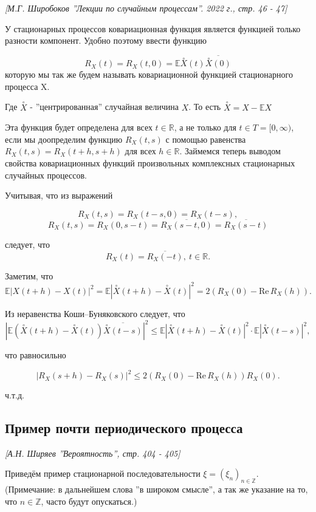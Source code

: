 \emph{[М.Г. Широбоков ''Лекции по случайным процессам''. 2022 г., стр. 46 - 47]}

У стационарных процессов ковариационная функция является
функцией только разности компонент. Удобно поэтому ввести функцию

$$R_X (t) = R_X (t,0) = \mathbb{E}\overset{\circ}{X}(t) \overline{\overset{\circ}{X}(0)}$$ которую мы так же будем называть ковариационной функцией стационарного процесса X. 

Где $\overset{\circ}{X}$ - ''центрированная'' случайная величина $X$. То есть $\overset{\circ}{X} = X - \mathbb EX$

Эта функция будет определена для всех $t \in \mathbb{R}$, а не только для $t \in T = [0,\infty) $, если мы доопределим функцию $R_X (t,s) $ с помощью равенства $R_X(t,s) = R_X(t+h,s+h)$ для всех $h \in \mathbb{R}$.  Займемся теперь выводом свойства ковариационных функций произвольных
комплексных стационарных случайных процессов.

Учитывая, что из выражений

$$R_X(t,s) = R_X(t-s,0) = R_X(t-s),$$
$$R_X(t,s) = R_X(0,s-t) = \overline{ R_X(s-t,0)} = \overline {R_X(s-t)}$$

следует, что
$$R_X(t) = \overline{ R_X(-t)}, \ t \in \mathbb {R}.$$

Заметим, что
$$\mathbb{E}|X(t+h) - X(t)|^2 = \mathbb{E}|\overset{\circ}{X}(t+h) - \overset{\circ}{X}(t)|^2 = 2(R_X (0) - \mathrm{Re}\,R_{X}(h)).$$

Из неравенства Коши–Буняковского следует, что
$$|\mathbb{E}(\overset{\circ}{X}(t+h) - \overset{\circ}{X}(t)) \overline{\overset{\circ}{X}(t-s)}|^2 \leq \mathbb{E}|\overset{\circ}{X}(t+h) - \overset{\circ}{X}(t)|^2 \cdot \mathbb{E}|\overset{\circ}{X}(t-s)|^2,$$

что равносильно

$$|R_{X}(s+h)-R_{X}(s)|^{2}\leq2(R_{X}(0)-\mathrm{Re}\,R_{X}(h))R_{X}(0).$$

ч.т.д.

\subsection{Пример почти периодического процесса}

\emph{[А.Н. Ширяев ''Вероятность'', стр. 404 - 405]}

Приведём пример стационарной последовательности $\xi = (\xi_{n})_{n \in \mathbb {Z}}$. (Примечание: в дальнейшем слова ''в широком смысле'', а так же указание на то, что $n \in \mathbb {Z}$, часто будут опускаться.)

